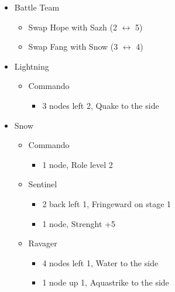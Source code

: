 \documentclass{report}
\begin{document}
\begin{menu}
\begin{itemize}
    \paradigm
    \begin{itemize}
        \item Battle Team
        \begin{itemize}
            \item Swap Hope with Sazh (2 $\leftrightarrow$ 5)
            \item Swap Fang with Snow (3 $\leftrightarrow$ 4)
        \end{itemize}
{\paradigmline{\textit{\com}}{\textit{\syn}}{\textit{(\com)}}}%
{\paradigmline{(\rav)}{\rav}{\rav}}%
{\paradigmline{(\com)}{\syn}{\sen}}%
{\paradigmline{[\rav]}{(\rav)}{(\rav)}}%
{\paradigmline{\com}{[\com]}{\com}}%
{\paradigmline{\com}{[\com]}{\com}}
    \end{itemize}
    \crystarium
    \begin{itemize}
        \item Lightning
        \begin{itemize}
            \item Commando
            \begin{itemize}
                \item 3 nodes left 2, Quake to the side
            \end{itemize}
        \end{itemize}
        \item Snow
        \begin{itemize}
            \item Commando
            \begin{itemize}
                \item 1 node, Role level 2
            \end{itemize}
            \item Sentinel
            \begin{itemize}
                \item 2 back left 1, Fringeward on stage 1
                \item 1 node, Strenght +5
            \end{itemize}
            \item Ravager
            \begin{itemize}
                \item 4 nodes left 1, Water to the side
                \item 1 node up 1, Aquastrike to the side

\end{itemize}
\end{itemize}
\end{itemize}
\end{itemize}
\end{menu}
\end{document}
